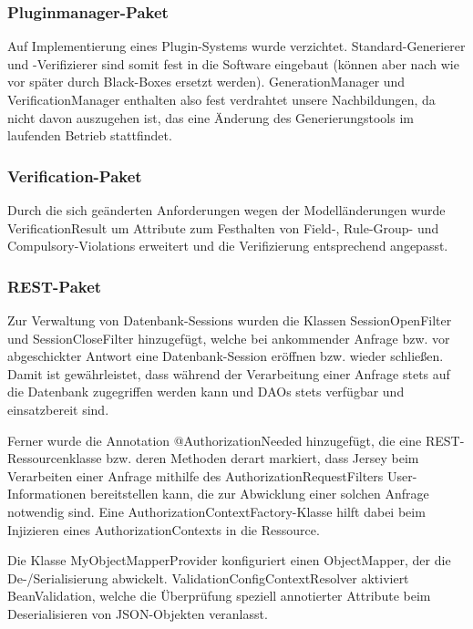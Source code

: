 \subsubsection{Pluginmanager-Paket}

Auf Implementierung eines Plugin-Systems wurde verzichtet.
Standard-Generierer und -Verifizierer sind somit fest in die Software eingebaut (können aber nach wie vor später durch Black-Boxes ersetzt werden). GenerationManager und VerificationManager enthalten also fest verdrahtet unsere Nachbildungen, da nicht davon auszugehen ist, das eine Änderung des Generierungstools im laufenden Betrieb stattfindet.


\subsubsection{Verification-Paket}

Durch die sich geänderten Anforderungen wegen der Modelländerungen wurde VerificationResult um Attribute zum Festhalten von Field-, Rule-Group- und Compulsory-Violations erweitert und die Verifizierung entsprechend angepasst.


\subsubsection{REST-Paket}

Zur Verwaltung von Datenbank-Sessions wurden die Klassen SessionOpenFilter und SessionCloseFilter hinzugefügt, welche bei ankommender Anfrage bzw. vor abgeschickter Antwort eine Datenbank-Session eröffnen bzw. wieder schließen. Damit ist gewährleistet, dass während der Verarbeitung einer Anfrage stets auf die Datenbank zugegriffen werden kann und DAOs stets verfügbar und einsatzbereit sind.

Ferner wurde die Annotation @AuthorizationNeeded hinzugefügt, die eine REST-Ressourcenklasse bzw. deren Methoden derart markiert, dass Jersey beim Verarbeiten einer Anfrage mithilfe des AuthorizationRequestFilters User-Informationen bereitstellen kann, die zur Abwicklung einer solchen Anfrage notwendig sind. Eine AuthorizationContextFactory-Klasse hilft dabei beim Injizieren eines AuthorizationContexts in die Ressource.

Die Klasse MyObjectMapperProvider konfiguriert einen ObjectMapper, der die De-/Serialisierung abwickelt. ValidationConfigContextResolver aktiviert BeanValidation, welche die Überprüfung speziell annotierter Attribute beim Deserialisieren von JSON-Objekten veranlasst.


